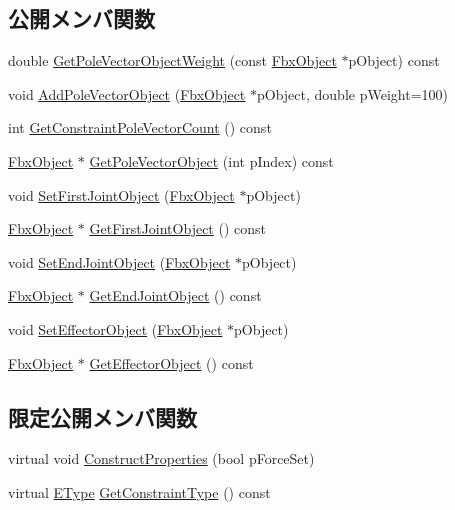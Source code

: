 \subsection*{公開メンバ関数}
\begin{DoxyCompactItemize}
\item 
double \hyperlink{class_fbx_constraint_single_chain_i_k_ae212fc88bd99906d8aadcc160dc0c1b8}{Get\+Pole\+Vector\+Object\+Weight} (const \hyperlink{class_fbx_object}{Fbx\+Object} $\ast$p\+Object) const
\item 
void \hyperlink{class_fbx_constraint_single_chain_i_k_a26abc95e8442f40ec86f38ef9e4748b8}{Add\+Pole\+Vector\+Object} (\hyperlink{class_fbx_object}{Fbx\+Object} $\ast$p\+Object, double p\+Weight=100)
\item 
int \hyperlink{class_fbx_constraint_single_chain_i_k_afeb5c6ab6342ec4aa81e69d3c9888bac}{Get\+Constraint\+Pole\+Vector\+Count} () const
\item 
\hyperlink{class_fbx_object}{Fbx\+Object} $\ast$ \hyperlink{class_fbx_constraint_single_chain_i_k_a59e6ce644cae71cba898be453e74663c}{Get\+Pole\+Vector\+Object} (int p\+Index) const
\item 
void \hyperlink{class_fbx_constraint_single_chain_i_k_a3c4bb5735bed369b73eeb42757a6aa1f}{Set\+First\+Joint\+Object} (\hyperlink{class_fbx_object}{Fbx\+Object} $\ast$p\+Object)
\item 
\hyperlink{class_fbx_object}{Fbx\+Object} $\ast$ \hyperlink{class_fbx_constraint_single_chain_i_k_a0dc8be31ce58d635c933561fd73010f1}{Get\+First\+Joint\+Object} () const
\item 
void \hyperlink{class_fbx_constraint_single_chain_i_k_a17923d89b6f7795c5322b1f9241845c1}{Set\+End\+Joint\+Object} (\hyperlink{class_fbx_object}{Fbx\+Object} $\ast$p\+Object)
\item 
\hyperlink{class_fbx_object}{Fbx\+Object} $\ast$ \hyperlink{class_fbx_constraint_single_chain_i_k_a0159badf18fe865398ae2056d86fe074}{Get\+End\+Joint\+Object} () const
\item 
void \hyperlink{class_fbx_constraint_single_chain_i_k_af7dbd878134a3b9255e7ab11830d3206}{Set\+Effector\+Object} (\hyperlink{class_fbx_object}{Fbx\+Object} $\ast$p\+Object)
\item 
\hyperlink{class_fbx_object}{Fbx\+Object} $\ast$ \hyperlink{class_fbx_constraint_single_chain_i_k_ac4c0052ea23d8e9a144bd9439cee2507}{Get\+Effector\+Object} () const
\end{DoxyCompactItemize}
\subsection*{限定公開メンバ関数}
\begin{DoxyCompactItemize}
\item 
virtual void \hyperlink{class_fbx_constraint_single_chain_i_k_aeffab44c49ad72283bdb07e50e9baf77}{Construct\+Properties} (bool p\+Force\+Set)
\item 
virtual \hyperlink{class_fbx_constraint_a49c1634663395eab7c28856df233ec66}{E\+Type} \hyperlink{class_fbx_constraint_single_chain_i_k_adc9d38f5ae55bf9c6415334a81cbdffb}{Get\+Constraint\+Type} () const
\end{DoxyCompactItemize}
